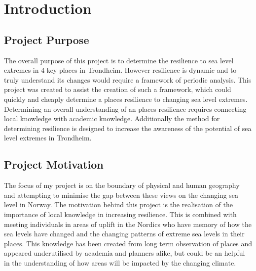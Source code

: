 




\chapter{Introduction}

\section{Project Purpose}
The overall purpose of this project is to determine the resilience to sea level extremes in 4 key places in Trondheim. However resilience is dynamic and to truly understand its changes would require a framework of periodic analysis. This project was created to assist the creation of such a framework, which could quickly and cheaply determine a places resilience to changing sea level extremes. Determining an overall understanding of an places resilience requires connecting local knowledge with academic knowledge. Additionally the method for determining resilience is designed to increase the awareness of the potential of sea level extremes in Trondheim. 

\section{Project Motivation}
 The focus of my project is on the boundary of physical and human geography and attempting to minimise the gap between these views on the changing sea level in Norway. The motivation behind this project is the realisation of the importance of local knowledge in increasing resilience. This is combined with meeting individuals in areas of uplift in the Nordics who have memory of how the sea levels have changed and the changing patterns of extreme sea levels in their places. This knowledge has been created from long term observation of places and appeared underutilised by academia and planners alike, but could be an helpful in the understanding of how areas will be impacted by the changing climate. 

